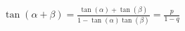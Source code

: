 \documentclass[preview]{standalone}
\begin{document}
\begin{align*}
\tan(\alpha + \beta) = \frac{\tan(\alpha) + \tan(\beta)}{1 - \tan(\alpha)\tan(\beta)} = \frac{p}{1-q}
\end{align*}
\end{document}
